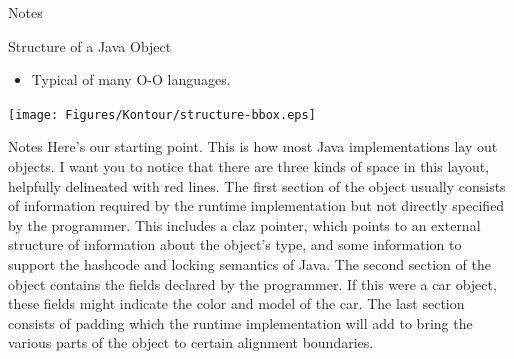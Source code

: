 \documentclass[%
pdf,
colorBG,
slideColor,
nototal,
oqe
]{prosper}
\newenvironment{talknotes}{\begin{slide}{Notes}\tiny}{\end{slide}}
\begin{document}
\begin{talknotes}
\end{talknotes}

\begin{slide}{Structure of a Java Object}
\begin{itemize}
\item Typical of many O-O languages.
\end{itemize}
\begin{center}
\texttt{[image: Figures/Kontour/structure-bbox.eps]}
\end{center}
\end{slide}

\begin{talknotes}
Here's our starting point.  This is how most Java implementations lay
out objects.  I want you to notice that there are three kinds of space
in this layout, helpfully delineated with red lines.  The first
section of the object usually consists of information required by
the runtime implementation but not directly specified by the
programmer.  This includes a claz pointer, which points to an
external structure of information about the object's type, and
some information to support the hashcode and locking semantics of
Java.  %
The second section of the object contains the fields declared by
the programmer.  If this were a car object, these fields might
indicate the color and model of the car.  The last section
consists of padding which the runtime implementation will
add to bring the various parts of the object to certain alignment
boundaries.
\end{talknotes}

\end{document}
